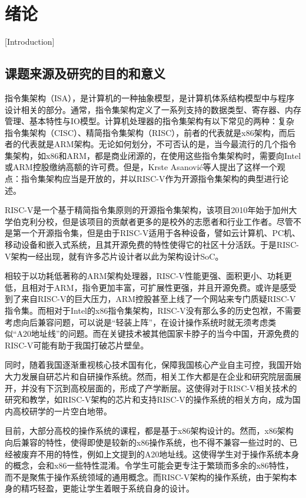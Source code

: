 
\chapter{绪论}[Introduction]

\section{课题来源及研究的目的和意义}

指令集架构（ISA），是计算机的一种抽象模型，是计算机体系结构模型中与程序设计相关的部分。通常，指令集架构定义了一系列支持的数据类型、寄存器、内存管理、基本特性与IO模型。计算机处理器的指令集架构有以下常见的两种：复杂指令集架构（CISC）、精简指令集架构（RISC），前者的代表就是x86架构，而后者的代表就是ARM架构\cite{DBLP:conf/hpca/BlemMS13}。无论如何划分，不可否认的是，当今最流行的几个指令集架构，如x86和ARM，都是商业闭源的，在使用这些指令集架构时，需要向Intel或ARM控股缴纳高额的许可费。但是，Krste Asanović等人提出了这样一个观点：指令集架构应当是开放的，并以RISC-V作为开源指令集架构的典型进行论述\cite{Asanović:EECS-2014-146}。

RISC-V是一个基于精简指令集原则的开源指令集架构，该项目2010年始于加州大学伯克利分校，但是该项目的贡献者更多的是校外的志愿者和行业工作者。尽管不是第一个开源指令集，但是由于RISC-V适用于各种设备，譬如云计算机、PC机、移动设备和嵌入式系统，且其开源免费的特性使得它的社区十分活跃。于是RISC-V架构一经出现，就有许多芯片设计者以此为架构设计SoC\cite{DBLP:conf/asap/FlamandR0LPRB18}\cite{DBLP:journals/jssc/KellerCZKPLBBCD17}\cite{7436635}。

相较于以功耗低著称的ARM架构处理器，RISC-V性能更强、面积更小、功耗更低\cite{A45nm1.3GHz}，且相对于ARM，指令更加丰富，可扩展性更强，并且开源免费。或许是感受到了来自RISC-V的巨大压力，ARM控股甚至上线了一个网站来专门质疑RISC-V指令集。而相对于Intel的x86指令集架构，RISC-V没有那么多的历史包袱，不需要考虑向后兼容问题，可以说是“轻装上阵”，在设计操作系统时就无须考虑类似“A20地址线”的问题。而在关键技术被其他国家卡脖子的当今中国，开源免费的RISC-V可能有助于我国打破芯片壁垒。

同时，随着我国逐渐重视核心技术国有化，保障我国核心产业自主可控，我国开始大力发展自研芯片和自研操作系统。然而，相关工作大都是在企业和研究院层面展开，并没有下沉到高校层面的，形成了产学断层。这使得对于RISC-V相关技术的研究和教学，如RISC-V架构的芯片和支持RISC-V的操作系统的相关方向，成为国内高校研学的一片空白地带。

目前，大部分高校的操作系统的课程，都是基于x86架构设计的。然而，x86架构向后兼容的特性，使得即使是较新的x86操作系统，也不得不兼容一些过时的、已经被废弃不用的特性，例如上文提到的A20地址线。这使得学生对于操作系统本身的概念，会和x86一些特性混淆。令学生可能会更专注于繁琐而多余的x86特性，而不是聚焦于操作系统领域的通用概念。而RISC-V架构的操作系统，由于架构本身的精巧轻盈，更能让学生着眼于系统自身的设计。

